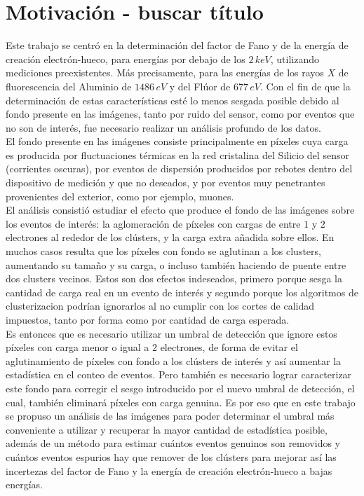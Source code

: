 \section{Motivación - buscar título}
\noindent Este trabajo se centró en la determinación del factor de Fano y de la energía de creación electrón-hueco, para energías por debajo de los $2\,\si{keV}$, utilizando mediciones preexistentes. Más precisamente, para las energías de los rayos $X$ de fluorescencia del Aluminio de $1486\,\si{eV}$ y del Flúor de $677\,\si{eV}$. Con el fin de que la determinación de estas características esté lo menos sesgada posible debido al fondo presente en las imágenes, tanto por ruido del sensor, como por eventos que no son de interés, fue necesario realizar un análisis profundo de los datos.\\
\indent El fondo presente en las imágenes consiste principalmente en píxeles cuya carga es producida por fluctuaciones térmicas en la red cristalina del Silicio del sensor (corrientes oscuras), por eventos de dispersión producidos por rebotes dentro del dispositivo de medición y que no deseados, y por eventos muy penetrantes provenientes del exterior, como por ejemplo, muones.\\
\indent El análisis consistió estudiar el efecto que produce el fondo de las imágenes sobre los eventos de interés: la aglomeración de píxeles con cargas de entre $1$ y $2$ electrones al rededor de los clústers, y la carga extra añadida sobre ellos. En muchos casos resulta que los píxeles con fondo se aglutinan a los clusters, aumentando su tamaño y su carga, o incluso también haciendo de puente entre dos clusters vecinos. Estos son dos efectos indeseados, primero porque sesga la cantidad de carga real en un evento de interés y segundo porque los algoritmos de clusterizacion podrían ignorarlos al no cumplir con los cortes de calidad impuestos, tanto por forma como por cantidad de carga esperada.\\
\indent Es entonces que es necesario utilizar un umbral de detección que ignore estos píxeles con carga menor o igual a $2$ electrones, de forma de evitar el aglutinamiento de píxeles con fondo a los clústers de interés y así aumentar la estadística en el conteo de eventos. Pero también es necesario lograr caracterizar este fondo para corregir el sesgo introducido por el nuevo umbral de detección, el cual, también eliminará píxeles con carga genuina. Es por eso que en este trabajo se propuso un análisis de las imágenes para poder determinar el umbral más conveniente a utilizar y recuperar la mayor cantidad de estadística posible, además de un método para estimar cuántos eventos genuinos son removidos y cuántos eventos espurios hay que remover de los clústers para mejorar así las incertezas del factor de Fano y la energía de creación electrón-hueco a bajas energías.

